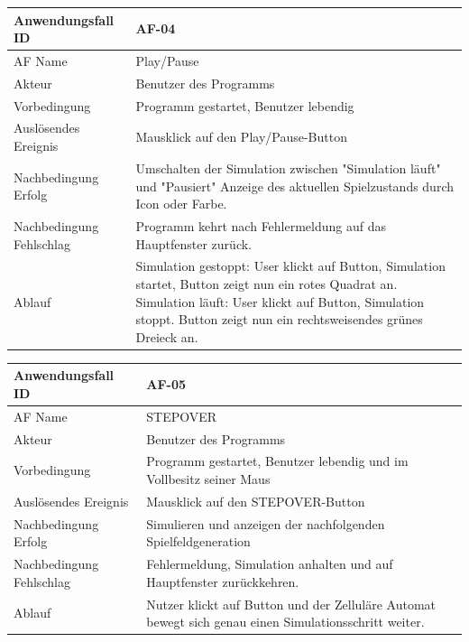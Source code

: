 \documentclass[11pt,a4paper]{article}
\begin{document}
\begin{tabular}[m]{|m{7cm}|m{9cm}|}
    \hline
    Anwendungsfall ID     & AF-04 \\
         \hline
    AF Name     &  Play/Pause \\
         \hline
    Akteur&Benutzer des Programms \\
    \hline
    Vorbedingung&Programm gestartet, Benutzer lebendig\\
    \hline
    Auslösendes Ereignis&Mausklick auf den Play/Pause-Button\\
    \hline
    Nachbedingung Erfolg&Umschalten der Simulation zwischen "Simulation läuft" und "Pausiert" Anzeige des aktuellen Spielzustands durch Icon oder Farbe.\\
    \hline
    Nachbedingung Fehlschlag&Programm kehrt nach Fehlermeldung auf das Hauptfenster zurück.\\
    \hline
    Ablauf&Simulation gestoppt: User klickt auf Button, Simulation startet, Button zeigt nun ein rotes Quadrat an. Simulation läuft: User klickt auf Button, Simulation stoppt. Button zeigt nun ein rechtsweisendes grünes Dreieck an.\\
    \hline
\end{tabular}
\par


\begin{tabular}[m]{|m{7cm}|m{9cm}|}
    \hline
    Anwendungsfall ID     & AF-05 \\
         \hline
    AF Name     &  STEPOVER \\
         \hline
    Akteur&Benutzer des Programms \\
    \hline
    Vorbedingung&Programm gestartet, Benutzer lebendig und im Vollbesitz seiner Maus\\
    \hline
    Auslösendes Ereignis&Mausklick auf den STEPOVER-Button\\
    \hline
    Nachbedingung Erfolg& Simulieren und anzeigen der nachfolgenden Spielfeldgeneration\\
    \hline
    Nachbedingung Fehlschlag&Fehlermeldung, Simulation anhalten und auf Hauptfenster zurückkehren.\\
    \hline
    Ablauf&Nutzer klickt auf Button und der Zelluläre Automat bewegt sich genau einen Simulationsschritt weiter.\\
    \hline
\end{tabular}
\par
\end{document}
